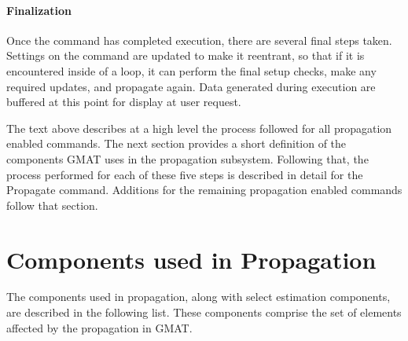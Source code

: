 \documentclass[10pt]{article}
\begin{document}
\paragraph{Finalization}

Once the command has completed execution, there are several final steps taken.  Settings on the
command are updated to make it reentrant, so that if it is encountered inside of a loop, it can
perform the final setup checks, make any required updates, and propagate again.  Data generated
during execution are buffered at this point for display at user request.

The text above describes at a high level the process followed for all propagation enabled commands.
The next section provides a short definition of the components GMAT uses in the propagation
subsystem.  Following that, the process performed for each of these five steps is described in
detail for the Propagate command.  Additions for the remaining propagation enabled commands follow
that section.

\section{Components used in Propagation}

The components used in propagation, along with select estimation components, are described in the
following list.  These components comprise the set of elements affected by the propagation in GMAT.
\end{document}
